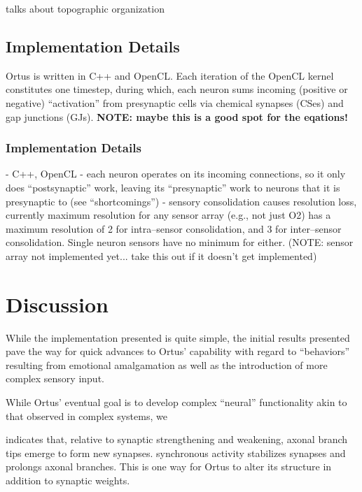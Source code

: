 \documentclass[letterpaper]{article}
\begin{document}
\cite{wiredforbehaviors} talks about topographic organization

\subsection{Implementation Details} Ortus is written in C++ and OpenCL. Each iteration of the OpenCL kernel constitutes one timestep, during which, each neuron sums incoming (positive or negative) ``activation'' from presynaptic cells via chemical synapses (CSes) and gap junctions (GJs).  \textbf{NOTE: maybe this is a good spot for the eqations!}




% 


\subsubsection{Implementation Details}
- C++, OpenCL
- each neuron operates on its incoming connections, so it only does ``postsynaptic'' work, leaving its ``presynaptic'' work to neurons that it is presynaptic to (see ``shortcomings'')
- sensory consolidation causes resolution loss, currently maximum resolution for any sensor array (e.g., not just O2) has a maximum resolution of 2 for intra--sensor consolidation, and 3 for inter--sensor consolidation. Single neuron sensors have no minimum for either. (NOTE: sensor array not implemented yet... take this out if it doesn't get implemented)

\section{Discussion}
While the implementation presented is quite simple, the initial results presented pave the way for quick advances to Ortus' capability with regard to ``behaviors'' resulting from emotional amalgamation as well as the introduction of more complex sensory input.


While Ortus' eventual goal is to develop complex ``neural'' functionality akin to that observed in complex systems, we

\citet{Kutsarova2016} indicates that, relative to synaptic strengthening and weakening, axonal branch tips emerge to form new synapses. synchronous activity stabilizes synapses and prolongs axonal branches. This is one way for Ortus to alter its structure in addition to synaptic weights.
\end{document}
